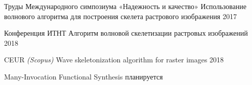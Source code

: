 

\begin{cventries}

  \cventry
    {Труды Международного симпозиума «Надежность и качество»} %
    {Использование волнового алгоритма для построения скелета растрового изображения} %
    { } %
    {2017} %
    {
      \begin{cvitems} %
      \end{cvitems}
    }
  \cventry
    {Конференция ИТНТ} %
    {Алгоритм волновой скелетизации растровых изображений} %
    { } %
    {2018} %
    {
\begin{cvitems} %
      \end{cvitems}
    }
    
      \cventry
    {CEUR \textit{(Scopus)}} %
    {Wave skeletonization algorithm for raster images} %
    { } %
    {2018} %
    {
      \begin{cvitems} %
      \end{cvitems}
    }
    
    
    \cventry
    {} %
    {Many-Invocation Functional Synthesis} %
    { } %
    {планируется} %
    {
      \begin{cvitems} %
      \end{cvitems}
    }
\end{cventries}
